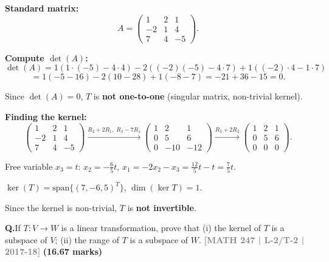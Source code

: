 \documentclass[12pt,a3paper]{article}
\newcommand{\yr}[1]{\hfill\textcolor{gray}{\small\textbf{[#1]}}}
\newcommand{\mk}[1]{\textcolor{orange!70!black}{\small\textbf{(#1 marks)}}}
\newcounter{qnum}
\newcommand{\Q}[1]{%
  \needspace{4\baselineskip}
  \refstepcounter{qnum}
  \vspace{6pt}
  \noindent\textbf{Q\theqnum.}\enspace #1\par
}
\begin{document}
\begin{tcolorbox}[enhanced,breakable,
  colback=cF!4,colframe=cF,boxrule=0.8pt,arc=5pt,
  title={\textbf{Answer --- $T:\mathbb{R}^3\to\mathbb{R}^3$ (given by $w_i$): One-to-One?}},
  fonttitle=\bfseries\color{white},colbacktitle=cF]

\textbf{Standard matrix:}
\[
A=\begin{pmatrix}1&2&1\\-2&1&4\\7&4&-5\end{pmatrix}.
\]

\textbf{Compute $\det(A)$:}
\[
\det(A)=1(1\cdot(-5)-4\cdot4)-2((-2)(-5)-4\cdot7)+1((-2)\cdot4-1\cdot7)
\]
\[
=1(-5-16)-2(10-28)+1(-8-7)
=-21+36-15=0.
\]

Since $\det(A)=0$, $T$ is \textbf{not one-to-one} (singular matrix, non-trivial kernel).

\textbf{Finding the kernel:}
\[
\begin{pmatrix}1&2&1\\-2&1&4\\7&4&-5\end{pmatrix}
\xrightarrow{R_2+2R_1,\;R_3-7R_1}
\begin{pmatrix}1&2&1\\0&5&6\\0&-10&-12\end{pmatrix}
\xrightarrow{R_3+2R_2}
\begin{pmatrix}1&2&1\\0&5&6\\0&0&0\end{pmatrix}.
\]

Free variable $x_3=t$: $x_2=-\tfrac{6}{5}t$, $x_1=-2x_2-x_3=\tfrac{12}{5}t-t=\tfrac{7}{5}t$.

$\ker(T)=\mathrm{span}\{(7,-6,5)^T\}$, $\dim(\ker T)=1$.

Since the kernel is non-trivial, $T$ is \textbf{not invertible}.

\end{tcolorbox}

\Q{If $T: V \to W$ is a linear transformation, prove that (i) the kernel of $T$ is a subspace of $V$; (ii) the range of $T$ is a subspace of $W$.
\yr{MATH 247 | L-2/T-2 | 2017-18} \mk{16.67}}
\end{document}
